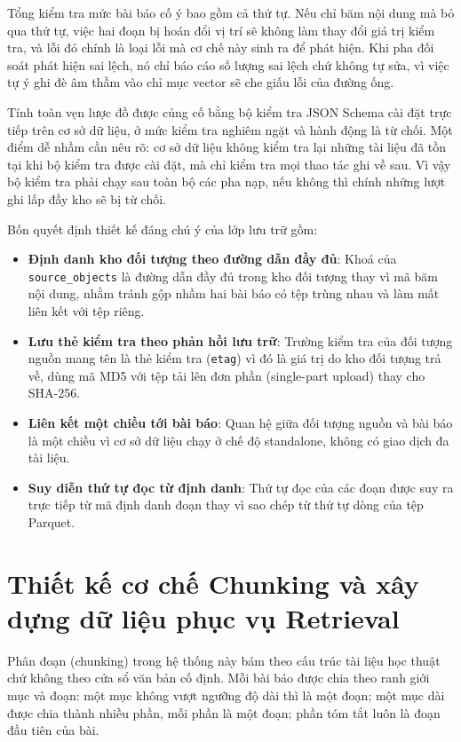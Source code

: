 Tổng kiểm tra mức bài báo cố ý bao gồm cả thứ tự. Nếu chỉ băm nội dung mà bỏ qua thứ tự, việc hai đoạn bị hoán đổi vị trí sẽ không làm thay đổi giá trị kiểm tra, và lỗi đó chính là loại lỗi mà cơ chế này sinh ra để phát hiện. Khi pha đối soát phát hiện sai lệch, nó chỉ báo cáo số lượng sai lệch chứ không tự sửa, vì việc tự ý ghi đè âm thầm vào chỉ mục vector sẽ che giấu lỗi của đường ống.

Tính toàn vẹn lược đồ được củng cố bằng bộ kiểm tra JSON Schema cài đặt trực tiếp trên cơ sở dữ liệu, ở mức kiểm tra nghiêm ngặt và hành động là từ chối. Một điểm dễ nhầm cần nêu rõ: cơ sở dữ liệu không kiểm tra lại những tài liệu đã tồn tại khi bộ kiểm tra được cài đặt, mà chỉ kiểm tra mọi thao tác ghi về sau. Vì vậy bộ kiểm tra phải chạy sau toàn bộ các pha nạp, nếu không thì chính những lượt ghi lấp đầy kho sẽ bị từ chối.

Bốn quyết định thiết kế đáng chú ý của lớp lưu trữ gồm:
\begin{itemize}
    \item[--] \textbf{Định danh kho đối tượng theo đường dẫn đầy đủ}: Khoá của \texttt{source\_objects} là đường dẫn đầy đủ trong kho đối tượng thay vì mã băm nội dung, nhằm tránh gộp nhầm hai bài báo có tệp trùng nhau và làm mất liên kết với tệp riêng.
    \item[--] \textbf{Lưu thẻ kiểm tra theo phản hồi lưu trữ}: Trường kiểm tra của đối tượng nguồn mang tên là thẻ kiểm tra (\texttt{etag}) vì đó là giá trị do kho đối tượng trả về, dùng mã MD5 với tệp tải lên đơn phần (single-part upload) thay cho SHA-256.
    \item[--] \textbf{Liên kết một chiều tới bài báo}: Quan hệ giữa đối tượng nguồn và bài báo là một chiều vì cơ sở dữ liệu chạy ở chế độ standalone, không có giao dịch đa tài liệu.
    \item[--] \textbf{Suy diễn thứ tự đọc từ định danh}: Thứ tự đọc của các đoạn được suy ra trực tiếp từ mã định danh đoạn thay vì sao chép từ thứ tự dòng của tệp Parquet.
\end{itemize}

\section{Thiết kế cơ chế Chunking và xây dựng dữ liệu phục vụ Retrieval}
\label{sec:chunking-retrieval}

Phân đoạn (chunking) trong hệ thống này bám theo cấu trúc tài liệu học thuật chứ không theo cửa sổ văn bản cố định. Mỗi bài báo được chia theo ranh giới mục và đoạn: một mục không vượt ngưỡng độ dài thì là một đoạn; một mục dài được chia thành nhiều phần, mỗi phần là một đoạn; phần tóm tắt luôn là đoạn đầu tiên của bài.

